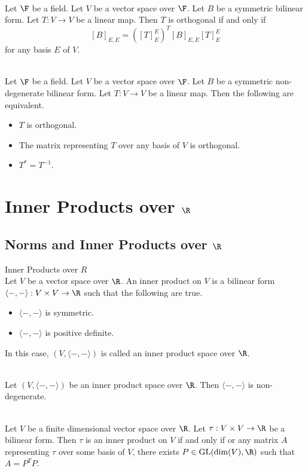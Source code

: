 \documentclass[a4paper]{article}
\begin{document}
\begin{prp}{}{}\\
Let $\F$ be a field. Let $V$ be a vector space over $\F$. Let $B$ be a symmetric bilinear form. Let $T:V\to V$ be a linear map. Then $T$ is orthogonal if and only if $$[B]_{E,E}=([T]_E^E)^T[B]_{E,E}[T]_E^E$$ for any basis $E$ of $V$. 
\end{prp}

\begin{prp}{}{}\\
Let $\F$ be a field. Let $V$ be a vector space over $\F$. Let $B$ be a symmetric non-degenerate bilinear form. Let $T:V\to V$ be a linear map. Then the following are equivalent. 
\begin{itemize}
\item $T$ is orthogonal. 
\item The matrix representing $T$ over any basis of $V$ is orthogonal. 
\item $T^\ast=T^{-1}$. 
\end{itemize} 
\end{prp}

\pagebreak
\section{Inner Products over $\R$}
\subsection{Norms and Inner Products over $\R$}
\begin{defn}{Inner Products over $R$}{}\\
Let $V$ be a vector space over $\R$. An inner product on $V$ is a bilinear form $\langle-,-\rangle:V\times V\to\R$ such that the following are true. 
\begin{itemize}
\item $\langle-,-\rangle$ is symmetric. 
\item $\langle-,-\rangle$ is positive definite. 
\end{itemize}
In this case, $(V,\langle-,-\rangle)$ is called an inner product space over $\R$. 
\end{defn}

\begin{lmm}{}{}\\
Let $(V,\langle-,-\rangle)$ be an inner product space over $\R$. Then $\langle-,-\rangle$ is non-degenerate. 
\end{lmm}

\begin{prp}{}{}\\
Let $V$ be a finite dimensional vector space over $\R$. Let $\tau:V\times V\to\R$ be a bilinear form. Then $\tau$ is an inner product on $V$ if and only if or any matrix $A$ representing $\tau$ over some basis of $V$, there exists $P\in\text{GL}(\dim(V),\R)$ such that $A=P^TP$. 
\end{prp}
\end{document}
